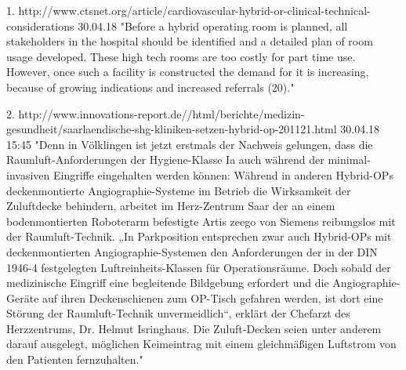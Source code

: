 1. http://www.ctsnet.org/article/cardiovascular-hybrid-or-clinical-technical-considerations 30.04.18	
	"Before a hybrid operating room is planned, all stakeholders in the hospital should be identified and a detailed plan of room usage developed. These high tech rooms are too costly for part time use. However, once such a facility is constructed the demand for it is increasing, because of growing indications and increased referrals (20)."
	
2. http://www.innovations-report.de//html/berichte/medizin-gesundheit/saarlaendische-shg-kliniken-setzen-hybrid-op-201121.html  30.04.18 15:45
	"Denn in Völklingen ist jetzt erstmals der Nachweis gelungen, dass die Raumluft-Anforderungen der Hygiene-Klasse Ia auch während der minimal-invasiven Eingriffe eingehalten werden können: Während in anderen Hybrid-OPs deckenmontierte Angiographie-Systeme im Betrieb die Wirksamkeit der Zuluftdecke behindern, arbeitet im Herz-Zentrum Saar der an einem bodenmontierten Roboterarm befestigte Artis zeego von Siemens reibungslos mit der Raumluft-Technik.
	„In Parkposition entsprechen zwar auch Hybrid-OPs mit deckenmontierten Angiographie-Systemen den Anforderungen der in der DIN 1946-4 festgelegten Luftreinheits-Klassen für Operationsräume. Doch sobald der medizinische Eingriff eine begleitende Bildgebung erfordert und die Angiographie-Geräte auf ihren Deckenschienen zum OP-Tisch gefahren werden, ist dort eine Störung der Raumluft-Technik unvermeidlich“, erklärt der Chefarzt des Herzzentrums, Dr. Helmut Isringhaus. Die Zuluft-Decken seien unter anderem darauf ausgelegt, möglichen Keimeintrag mit einem gleichmäßigen Luftstrom von den Patienten fernzuhalten."	

